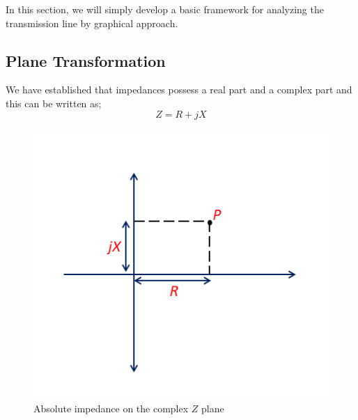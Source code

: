 In this section, we will simply develop a basic framework for analyzing the transmission line by graphical approach.

\subsection{Plane Transformation}
We have established that impedances possess a real part and a complex part and this can be written as;
\begin{equation*}
Z= R+jX
\end{equation*}

\begin{figure}[h]
\centering
\includegraphics[width=0.8\linewidth]{./graphics/Z_plane1}
\caption{Absolute impedance on the complex $Z$ plane}
\label{fig:mjhdj}
\end{figure}

